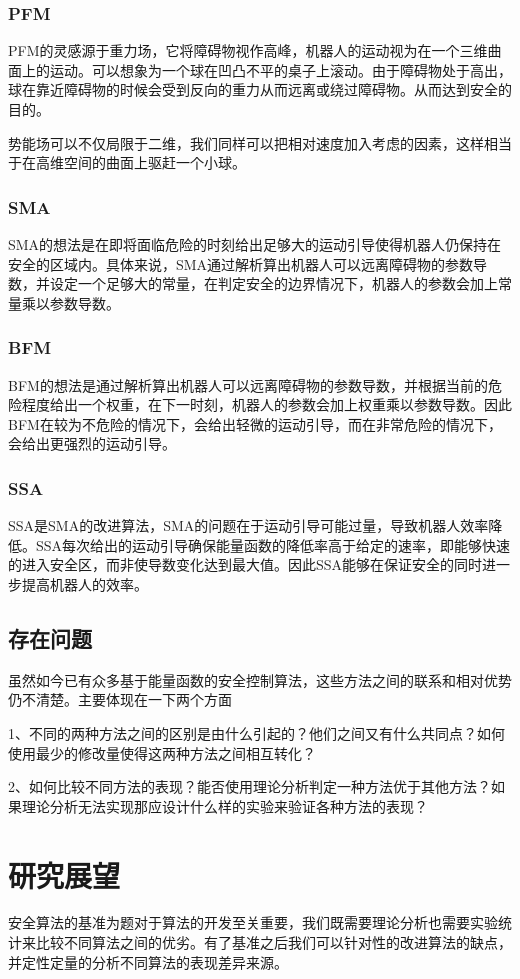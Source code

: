 \subsubsection{PFM}
PFM的灵感源于重力场，它将障碍物视作高峰，机器人的运动视为在一个三维曲面上的运动。可以想象为一个球在凹凸不平的桌子上滚动。由于障碍物处于高出，球在靠近障碍物的时候会受到反向的重力从而远离或绕过障碍物。从而达到安全的目的。

势能场可以不仅局限于二维，我们同样可以把相对速度加入考虑的因素，这样相当于在高维空间的曲面上驱赶一个小球。

\subsubsection{SMA}
SMA的想法是在即将面临危险的时刻给出足够大的运动引导使得机器人仍保持在安全的区域内。具体来说，SMA通过解析算出机器人可以远离障碍物的参数导数，并设定一个足够大的常量，在判定安全的边界情况下，机器人的参数会加上常量乘以参数导数。

\subsubsection{BFM}
BFM的想法是通过解析算出机器人可以远离障碍物的参数导数，并根据当前的危险程度给出一个权重，在下一时刻，机器人的参数会加上权重乘以参数导数。因此BFM在较为不危险的情况下，会给出轻微的运动引导，而在非常危险的情况下，会给出更强烈的运动引导。

\subsubsection{SSA}
SSA是SMA的改进算法，SMA的问题在于运动引导可能过量，导致机器人效率降低。SSA每次给出的运动引导确保能量函数的降低率高于给定的速率，即能够快速的进入安全区，而非使导数变化达到最大值。因此SSA能够在保证安全的同时进一步提高机器人的效率。

\subsection{存在问题}

虽然如今已有众多基于能量函数的安全控制算法，这些方法之间的联系和相对优势仍不清楚。主要体现在一下两个方面

1、不同的两种方法之间的区别是由什么引起的？他们之间又有什么共同点？如何使用最少的修改量使得这两种方法之间相互转化？

2、如何比较不同方法的表现？能否使用理论分析判定一种方法优于其他方法？如果理论分析无法实现那应设计什么样的实验来验证各种方法的表现？

\section{研究展望}

安全算法的基准为题对于算法的开发至关重要，我们既需要理论分析也需要实验统计来比较不同算法之间的优劣。有了基准之后我们可以针对性的改进算法的缺点，并定性定量的分析不同算法的表现差异来源。

\printbibliography[title={参考文献}]

